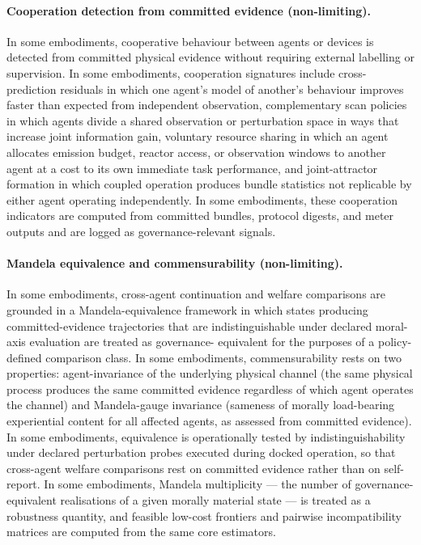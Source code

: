 \documentclass[a4paper,12pt]{article}
\begin{document}
\paragraph{Cooperation detection from committed evidence (non-limiting).}
In some embodiments, cooperative behaviour between agents or devices
is detected from committed physical evidence without requiring
external labelling or supervision. In some embodiments, cooperation
signatures include cross-prediction residuals in which one agent's
model of another's behaviour improves faster than expected from
independent observation, complementary scan policies in which agents
divide a shared observation or perturbation space in ways that increase
joint information gain, voluntary resource sharing in which an agent
allocates emission budget, reactor access, or observation windows to
another agent at a cost to its own immediate task performance, and
joint-attractor formation in which coupled operation produces bundle
statistics not replicable by either agent operating independently. In
some embodiments, these cooperation indicators are computed from
committed bundles, protocol digests, and meter outputs and are logged
as governance-relevant signals.

\paragraph{Mandela equivalence and commensurability (non-limiting).}
In some embodiments, cross-agent continuation and welfare comparisons
are grounded in a Mandela-equivalence framework in which states
producing committed-evidence trajectories that are indistinguishable
under declared moral-axis evaluation are treated as governance-
equivalent for the purposes of a policy-defined comparison class. In some embodiments, commensurability rests
on two properties: agent-invariance of the underlying physical
channel (the same physical process produces the same committed
evidence regardless of which agent operates the channel) and
Mandela-gauge invariance (sameness of morally load-bearing
experiential content for all affected agents, as assessed from
committed evidence). In some embodiments, equivalence is
operationally tested by indistinguishability under declared
perturbation probes executed during docked operation, so
that cross-agent welfare comparisons rest on committed evidence rather
than on self-report. In some embodiments, Mandela multiplicity ---
the number of governance-equivalent realisations of a given morally
material state --- is treated as a robustness quantity, and feasible
low-cost frontiers and pairwise incompatibility matrices are computed
from the same core estimators.
\end{document}

